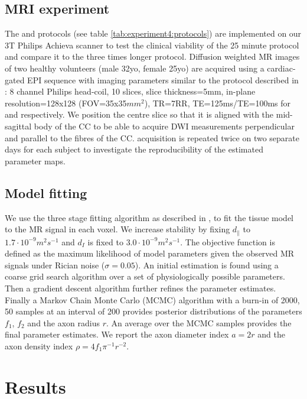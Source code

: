 \subsection*{MRI experiment}
The \SFshort{} and \OIlong{} protocols (see table \ref{tab:experiment4:protocols}) are implemented on our 3T Philips Achieva scanner to test the clinical viability of the 25 minute \SFshort{} protocol and compare it to the three times longer \OIlong{} protocol. Diffusion weighted MR images of two healthy volunteers (male 32yo, female 25yo) are acquired using a cardiac-gated EPI sequence with imaging parameters similar to the protocol described in \citep{Alexander:2010}: 8 channel Philips head-coil, 10 slices, slice thickness=5mm, in-plane resolution=128x128 (FOV=35x35$mm^2$), TR=7RR, TE=125ms/TE=100ms for \SFshort{} and \OIlong{} respectively. We position the centre slice so that it is aligned with the mid-sagittal body of the \gls{CC} to be able to acquire DWI measurements perpendicular and parallel to the fibres of the \gls{CC}. \SFshort{} acquisition is repeated twice on two separate days for each subject to investigate the reproducibility of the estimated parameter maps.
%
\subsection*{Model fitting}
We use the three stage fitting algorithm as described in \citet{Alexander:2010}, to fit the tissue model to the  MR signal in each voxel. We increase stability by fixing $d_\parallel$ to $1.7\cdot 10^{-9} m^2s^{-1}$ and $d_I$ is fixed to $3.0\cdot 10^{-9} m^2s^{-1}$\citep{Assaf:2008,Barazany:2009,Alexander:2010}. The objective function is defined as the maximum likelihood of model parameters given the observed MR signals under Rician noise ($\sigma=0.05$). An initial estimation is found using a coarse grid search algorithm over a set of physiologically possible parameters. Then a gradient descent algorithm further refines the parameter estimates. Finally a Markov Chain Monte Carlo (MCMC) algorithm with a burn-in of 2000, 50 samples at an interval of 200 provides posterior distributions of the parameters $f_1$, $f_2$ and the axon radius $r$. An average over the MCMC samples provides the final parameter estimates. We report the axon diameter index $a=2r$ and the axon density index $\rho=4f_1\pi^{-1}r^{-2}$.
\section{Results}
